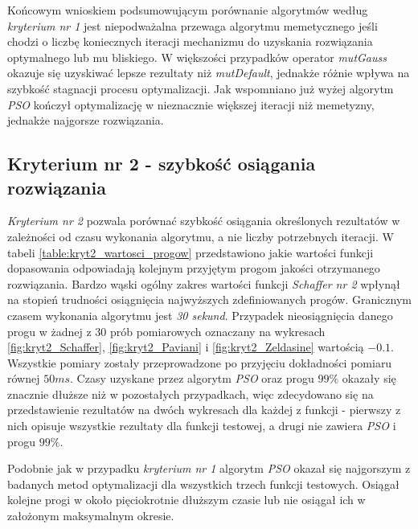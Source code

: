 \FloatBarrier

\par
Końcowym wnioskiem podsumowującym porównanie algorytmów według \emph{kryterium nr 1} jest niepodważalna przewaga algorytmu memetycznego jeśli chodzi o liczbę koniecznych iteracji mechanizmu do uzyskania rozwiązania optymalnego lub mu bliskiego. W większości przypadków operator \emph{mutGauss} okazuje się uzyskiwać lepsze rezultaty niż \emph{mutDefault}, jednakże różnie wpływa na szybkość stagnacji procesu optymalizacji. Jak wspomniano już wyżej algorytm \emph{PSO} kończył optymalizację w nieznacznie większej iteracji niż memetyzny, jednakże najgorsze rozwiązania.


\subsection{Kryterium nr 2 - szybkość osiągania rozwiązania}
%

\par
\emph{Kryterium nr 2} pozwala porównać szybkość osiągania określonych rezultatów w zależności od czasu wykonania algorytmu, a nie liczby potrzebnych iteracji. W tabeli \ref{table:kryt2_wartosci_progow} przedstawiono jakie wartości funkcji dopasowania odpowiadają kolejnym przyjętym progom jakości otrzymanego rozwiązania. Bardzo wąski ogólny zakres wartości funkcji \emph{Schaffer nr 2} wpłynął na stopień trudności osiągnięcia najwyższych zdefiniowanych progów. Granicznym czasem wykonania algorytmu jest \emph{30 sekund}. Przypadek nieosiągnięcia danego progu w żadnej z 30 prób pomiarowych oznaczany na wykresach \ref{fig:kryt2_Schaffer}, \ref{fig:kryt2_Paviani} i \ref{fig:kryt2_Zeldasine} wartością $-0.1$. Wszystkie pomiary zostały przeprowadzone po przyjęciu dokładności pomiaru równej $50 ms$. Czasy uzyskane przez algorytm \emph{PSO} oraz progu $99\%$ okazały się znacznie dłuższe niż w pozostałych przypadkach, więc zdecydowano się na przedstawienie rezultatów na dwóch wykresach dla każdej z funkcji - pierwszy z nich opisuje wszystkie rezultaty dla funkcji testowej, a drugi nie zawiera \emph{PSO} i progu $99\%$.
\par
Podobnie jak w przypadku \emph{kryterium nr 1} algorytm \emph{PSO} okazał się najgorszym z badanych metod optymalizacji dla wszystkich trzech funkcji testowych. Osiągał kolejne progi w około pięciokrotnie dłuższym czasie lub nie osiągał ich w założonym maksymalnym okresie. 


